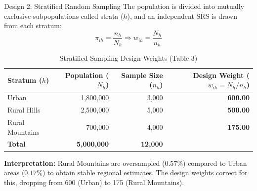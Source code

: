 \documentclass[10pt, aspectratio=169]{beamer}
\begin{document}
\begin{frame}{Design 2: Stratified Random Sampling}
  The population is divided into mutually exclusive subpopulations called strata ($h$), and an independent SRS is drawn from each stratum:
  \begin{equation}
    \pi_{ih} = \frac{n_h}{N_h} \Rightarrow w_{ih} = \frac{N_h}{n_h}
  \end{equation}

  \begin{table}
    \centering
    \footnotesize
    \begin{tabular}{lrrr}
      \toprule
      \textbf{Stratum ($h$)} & \textbf{Population ($N_h$)} & \textbf{Sample Size ($n_h$)} & \textbf{Design Weight ($w_{ih} = N_h/n_h$)} \\
      \midrule
      Urban & 1,800,000 & 3,000 & \textbf{600.00} \\
      Rural Hills & 2,500,000 & 5,000 & \textbf{500.00} \\
      Rural Mountains & 700,000 & 4,000 & \textbf{175.00} \\
      \midrule
      \textbf{Total} & \textbf{5,000,000} & \textbf{12,000} & \\
      \bottomrule
    \end{tabular}
    \caption{Stratified Sampling Design Weights (Table 3)}
  \end{table}

  \textbf{Interpretation:} Rural Mountains are oversampled ($0.57\%$) compared to Urban areas ($0.17\%$) to obtain stable regional estimates. The design weights correct for this, dropping from 600 (Urban) to 175 (Rural Mountains).
\end{frame}
\end{document}
